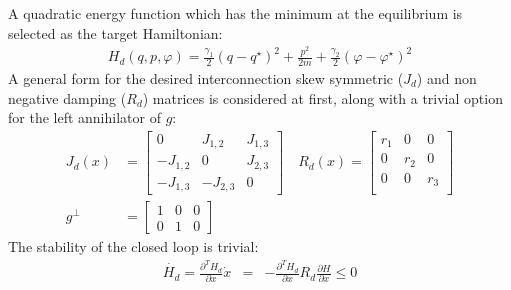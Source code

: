 \documentclass[letterpaper, 10pt, conference]{ieeeconf}
\begin{document}
A quadratic energy function which has the minimum at the equilibrium is selected as the target Hamiltonian:
\begin{align}
    H_d(q,p,\varphi) = \frac{\gamma_1}{2} (q-q^\star)^2 + \frac{p^2}{2m} + \frac{\gamma_2}{2}(\varphi-\varphi^\star)^2
\end{align}\label{eq:Hd}
A general form for the desired interconnection skew symmetric ($J_d$) and non negative damping ($R_d$) matrices is considered at first, along with a trivial option for the left annihilator of $g$:
\begin{equation}
    \begin{aligned}
    J_{d}(x) &= \begin{bmatrix}
        0 & J_{1,2} & J_{1,3}\\
        -J_{1,2} & 0 & J_{2,3}\\
        -J_{1,3} & -J_{2,3} & 0
    \end{bmatrix} \quad R_{d}(x) = \begin{bmatrix}
        r_{1} & 0 & 0\\
        0 & r_{2} & 0\\
        0 & 0 & r_{3}\\
    \end{bmatrix} \\
    g^\perp &= \begin{bmatrix}
        1 & 0 & 0\\ 
        0 & 1 & 0
    \end{bmatrix}
\end{aligned}
\end{equation}\label{eq:JRd}
The stability of the closed loop is trivial:
\begin{equation}
    \begin{aligned}
    \dot{H_{d}} = \frac{\partial^T H_{d}}{\partial x} \dot{x} &=& -\frac{\partial^T H_{d}}{\partial x} R_{d}\frac{\partial H}{\partial x}  \leq 0
\end{aligned}
\end{equation}\label{eq:IDA_stab}
\end{document}
